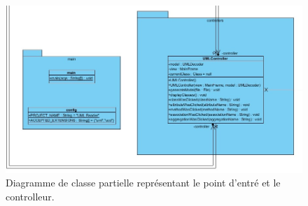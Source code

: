 \documentclass[12pt]{article} %
\begin{document}
\begin{figure}[h]
  \includegraphics[width=\linewidth]{img/ClassDiagram-Controller.jpg}
  \caption{Diagramme de classe partielle représentant le point d'entré et le controlleur.}
  \label{fig:classdiagram-controller}
\end{figure}
\end{document}
